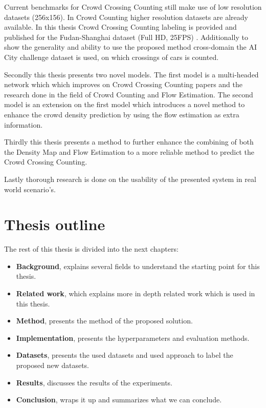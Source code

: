 Current benchmarks for Crowd Crossing Counting still make use of low resolution datasets \cite{Ma2013, ma_counting_2016} (256x156). In Crowd Counting higher resolution datasets are already available. In this thesis Crowd Crossing Counting labeling is provided and published for the Fudan-Shanghai dataset (Full HD, 25FPS) \cite{Fang2019}. Additionally to show the generality and ability to use the proposed method cross-domain the AI City challenge dataset is used, on which crossings of cars is counted.

Secondly this thesis presents two novel models. The first model is a multi-headed network which which improves on Crowd Crossing Counting papers and the research done in the field of Crowd Counting and Flow Estimation. The second model is an extension on the first model which introduces a novel method to enhance the crowd density prediction by using the flow estimation as extra information.

Thirdly this thesis presents a method to further enhance the combining of both the Density Map and Flow Estimation to a more reliable method to predict the Crowd Crossing Counting.

Lastly thorough research is done on the usability of the presented system in real world scenario's.


\section{Thesis outline}
The rest of this thesis is divided into the next chapters:

 \begin{itemize}
 	\item \textbf{Background}, explains several fields to understand the starting point for this thesis.
    \item \textbf{Related work}, which explains more in depth related work which is used in this thesis.
    \item \textbf{Method}, presents the method of the proposed solution.
    \item \textbf{Implementation}, presents the hyperparameters and evaluation methods.
    \item \textbf{Datasets}, presents the used datasets and used approach to label the proposed new datasets.
    \item \textbf{Results}, discusses the results of the experiments.
    \item \textbf{Conclusion}, wraps it up and summarizes what we can conclude.
 \end{itemize}

